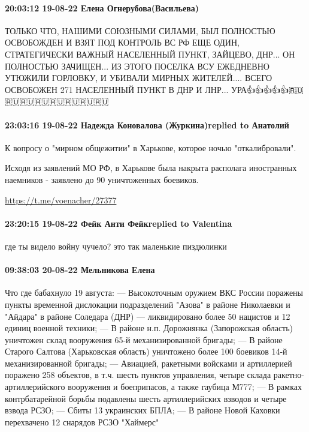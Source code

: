 \paragraph{20:03:12 19-08-22 Елена Огнерубова(Васильева)}

ТОЛЬКО ЧТО, НАШИМИ СОЮЗНЫМИ СИЛАМИ, БЫЛ ПОЛНОСТЬЮ ОСВОБОЖДЕН И ВЗЯТ ПОД
КОНТРОЛЬ ВС РФ ЕЩЕ ОДИН, СТРАТЕГИЧЕСКИ ВАЖНЫЙ НАСЕЛЕННЫЙ ПУНКТ, ЗАЙЦЕВО, ДНР...
ОН ПОЛНОСТЬЮ ЗАЧИЩЕН... ИЗ ЭТОГО ПОСЕЛКА ВСУ ЕЖЕДНЕВНО УТЮЖИЛИ ГОРЛОВКУ, И
УБИВАЛИ МИРНЫХ ЖИТЕЛЕЙ.... ВСЕГО ОСВОБОЖЕН 271 НАСЕЛЕННЫЙ ПУНКТ В ДНР И ЛНР...
УРА👍👍👍👍👍🇷🇺🇷🇺🇷🇺🇷🇺🇷🇺🇷🇺🇷🇺🇷🇺

\paragraph{23:03:16 19-08-22 Надежда Коновалова (Журкина)replied to Анатолий}

К вопросу о "мирном общежитии" в Харькове, которое ночью "откалибровали".

Исходя из заявлений МО РФ, в Харькове была накрыта располага иностранных
наемников - заявлено до 90 уничтоженных боевиков.

\url{https://t.me/voenacher/27377}


\paragraph{23:20:15 19-08-22 Фейк Анти Фейкreplied to Valentina}

где ты видело войну чучело? это так маленькие пиздюлинки

\paragraph{09:38:03 20-08-22 Мельникова Елена}

Что где бабахнуло 19 августа:
— Высокоточным оружием ВКС России поражены пункты временной дислокации подразделений "Азова" в районе Николаевки и "Айдара" в районе Соледара (ДНР) — ликвидировано более 50 нацистов и 12 единиц военной техники;
— В районе н.п. Дорожнянка (Запорожская область) уничтожен склад вооружения 65-й механизированной бригады;
— В районе Старого Салтова (Харьковская область) уничтожено более 100 боевиков 14-й механизированной бригады;
— Авиацией, ракетными войсками и артиллерией поражено 258 объектов, в т.ч. шесть пунктов управления, четыре склада ракетно-артиллерийского вооружения и боеприпасов, а также гаубица М777;
— В рамках контрбатарейной борьбы подавлены шесть артиллерийских взводов и четыре взвода РСЗО;
— Сбиты 13 украинских БПЛА;
— В районе Новой Каховки перехвачено 12 снарядов РСЗО "Хаймерс"

